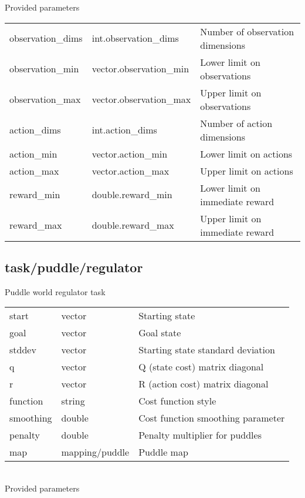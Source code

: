 \noindent Provided parameters\\

\noindent\begin{tabular}{@{}lll@{}}
observation\_dims&int.observation\_dims&Number of observation dimensions\\
observation\_min&vector.observation\_min&Lower limit on observations\\
observation\_max&vector.observation\_max&Upper limit on observations\\
action\_dims&int.action\_dims&Number of action dimensions\\
action\_min&vector.action\_min&Lower limit on actions\\
action\_max&vector.action\_max&Upper limit on actions\\
reward\_min&double.reward\_min&Lower limit on immediate reward\\
reward\_max&double.reward\_max&Upper limit on immediate reward\\
\end{tabular}
\subsection{task/puddle/regulator}
\noindent Puddle world regulator task\\

\noindent\begin{tabular}{@{}lll@{}}
start&vector&Starting state\\
goal&vector&Goal state\\
stddev&vector&Starting state standard deviation\\
q&vector&Q (state cost) matrix diagonal\\
r&vector&R (action cost) matrix diagonal\\
function&string&Cost function style\\
smoothing&double&Cost function smoothing parameter\\
penalty&double&Penalty multiplier for puddles\\
map&mapping/puddle&Puddle map\\
\end{tabular}
\\

\noindent Provided parameters\\

